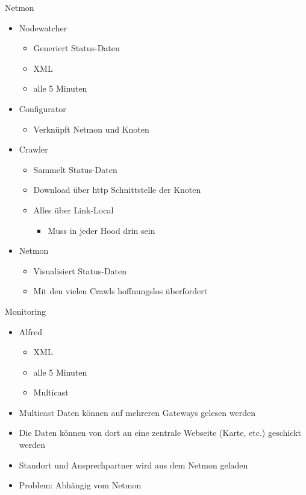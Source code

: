 \begin{frame}{Netmon}
    \begin{itemize}
        \item Nodewatcher
        \begin{itemize}
            \item Generiert Status-Daten
            \item XML
            \item alle 5 Minuten
        \end{itemize}
        \item Configurator
        \begin{itemize}
            \item Verknüpft Netmon und Knoten
        \end{itemize}
        \item Crawler
        \begin{itemize}
            \item Sammelt Status-Daten
            \item Download über http Schnittstelle der Knoten
            \item Alles über Link-Local
            \begin{itemize}
                \item Muss in jeder Hood drin sein
            \end{itemize}
        \end{itemize}
        \item Netmon
        \begin{itemize}
            \item Visualisiert Status-Daten
            \item Mit den vielen Crawls hoffnungslos überfordert
        \end{itemize}
    \end{itemize}
\end{frame}

\begin{frame}{Monitoring}
    \begin{itemize}
        \item Alfred
        \begin{itemize}
            \item XML
            \item alle 5 Minuten
            \item Multicast
        \end{itemize}
        \item Multicast Daten können auf mehreren Gateways gelesen werden
        \item Die Daten können von dort an eine zentrale Webseite (Karte, etc.) geschickt werden
        \item Standort und Ansprechpartner wird aus dem Netmon geladen
        \item Problem: Abhängig vom Netmon
    \end{itemize}
\end{frame}

